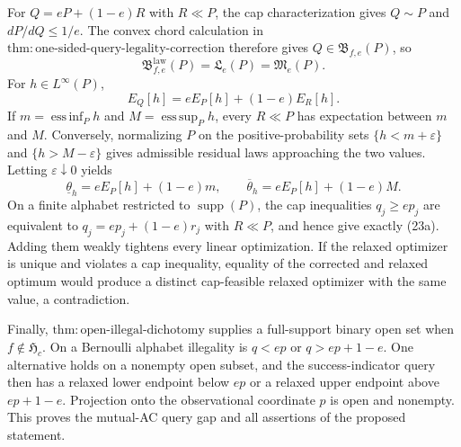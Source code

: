 For \(Q=eP+(1-e)R\) with \(R\ll P\), the cap characterization gives \(Q\sim P\) and \(dP/dQ\le1/e\).  The convex chord calculation in \(\mathrm{thm:one\text{-}sided\text{-}query\text{-}legality\text{-}correction}\) therefore gives \(Q\in\mathfrak B_{f,e}(P)\), so
\[
 \mathfrak B^{\mathrm{law}}_{f,e}(P)=\mathfrak L_e(P)=\mathfrak M_e(P). \tag{23a}
\]
For \(h\in L^\infty(P)\),
\[
 E_Q[h]=eE_P[h]+(1-e)E_R[h].
\]
If \(m=\operatorname*{ess\,inf}_P h\) and \(M=\operatorname*{ess\,sup}_P h\), every \(R\ll P\) has expectation between \(m\) and \(M\).  Conversely, normalizing \(P\) on the positive-probability sets \(\{h<m+\varepsilon\}\) and \(\{h>M-\varepsilon\}\) gives admissible residual laws approaching the two values.  Letting \(\varepsilon\downarrow0\) yields
\[
 \underline\theta_h=eE_P[h]+(1-e)m,
 \qquad
 \overline\theta_h=eE_P[h]+(1-e)M. \tag{23b}
\]
On a finite alphabet restricted to \(\operatorname{supp}(P)\), the cap inequalities \(q_j\ge ep_j\) are equivalent to \(q_j=ep_j+(1-e)r_j\) with \(R\ll P\), and hence give exactly (23a).  Adding them weakly tightens every linear optimization.  If the relaxed optimizer is unique and violates a cap inequality, equality of the corrected and relaxed optimum would produce a distinct cap-feasible relaxed optimizer with the same value, a contradiction.

Finally, \(\mathrm{thm:open\text{-}illegal\text{-}dichotomy}\) supplies a full-support binary open set when \(f\notin\mathfrak H_c\).  On a Bernoulli alphabet illegality is \(q<ep\) or \(q>ep+1-e\).  One alternative holds on a nonempty open subset, and the success-indicator query then has a relaxed lower endpoint below \(ep\) or a relaxed upper endpoint above \(ep+1-e\).  Projection onto the observational coordinate \(p\) is open and nonempty.  This proves the mutual-AC query gap and all assertions of the proposed statement.
